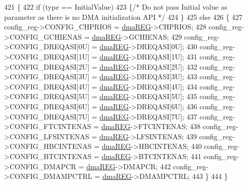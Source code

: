 \begin{DoxyCode}
421 \{
422     \textcolor{keywordflow}{if} (type == InitialValue)
423     \{\textcolor{comment}{/* Do not pass Initial value as parameter as there is no DMA initialization API */}
424     \}
425     \textcolor{keywordflow}{else}
426     \{
427         config\_reg->CONFIG\_CHPRIOS     = \mbox{\hyperlink{reg__dma_8h_aae27308852f460efc99fcbf6eb47ea86}{dmaREG}}->CHPRIOS;
428         config\_reg->CONFIG\_GCHIENAS    = \mbox{\hyperlink{reg__dma_8h_aae27308852f460efc99fcbf6eb47ea86}{dmaREG}}->GCHIENAS;
429         config\_reg->CONFIG\_DREQASI[0U] = \mbox{\hyperlink{reg__dma_8h_aae27308852f460efc99fcbf6eb47ea86}{dmaREG}}->DREQASI[0U];
430         config\_reg->CONFIG\_DREQASI[1U] = \mbox{\hyperlink{reg__dma_8h_aae27308852f460efc99fcbf6eb47ea86}{dmaREG}}->DREQASI[1U];
431         config\_reg->CONFIG\_DREQASI[2U] = \mbox{\hyperlink{reg__dma_8h_aae27308852f460efc99fcbf6eb47ea86}{dmaREG}}->DREQASI[2U];
432         config\_reg->CONFIG\_DREQASI[3U] = \mbox{\hyperlink{reg__dma_8h_aae27308852f460efc99fcbf6eb47ea86}{dmaREG}}->DREQASI[3U];
433         config\_reg->CONFIG\_DREQASI[4U] = \mbox{\hyperlink{reg__dma_8h_aae27308852f460efc99fcbf6eb47ea86}{dmaREG}}->DREQASI[4U];
434         config\_reg->CONFIG\_DREQASI[5U] = \mbox{\hyperlink{reg__dma_8h_aae27308852f460efc99fcbf6eb47ea86}{dmaREG}}->DREQASI[5U];
435         config\_reg->CONFIG\_DREQASI[6U] = \mbox{\hyperlink{reg__dma_8h_aae27308852f460efc99fcbf6eb47ea86}{dmaREG}}->DREQASI[6U];
436         config\_reg->CONFIG\_DREQASI[7U] = \mbox{\hyperlink{reg__dma_8h_aae27308852f460efc99fcbf6eb47ea86}{dmaREG}}->DREQASI[7U];
437         config\_reg->CONFIG\_FTCINTENAS  = \mbox{\hyperlink{reg__dma_8h_aae27308852f460efc99fcbf6eb47ea86}{dmaREG}}->FTCINTENAS;
438         config\_reg->CONFIG\_LFSINTENAS  = \mbox{\hyperlink{reg__dma_8h_aae27308852f460efc99fcbf6eb47ea86}{dmaREG}}->LFSINTENAS;
439         config\_reg->CONFIG\_HBCINTENAS  = \mbox{\hyperlink{reg__dma_8h_aae27308852f460efc99fcbf6eb47ea86}{dmaREG}}->HBCINTENAS;
440         config\_reg->CONFIG\_BTCINTENAS  = \mbox{\hyperlink{reg__dma_8h_aae27308852f460efc99fcbf6eb47ea86}{dmaREG}}->BTCINTENAS;
441         config\_reg->CONFIG\_DMAPCR      = \mbox{\hyperlink{reg__dma_8h_aae27308852f460efc99fcbf6eb47ea86}{dmaREG}}->DMAPCR;
442         config\_reg->CONFIG\_DMAMPCTRL   = \mbox{\hyperlink{reg__dma_8h_aae27308852f460efc99fcbf6eb47ea86}{dmaREG}}->DMAMPCTRL;
443     \}
444 \}
\end{DoxyCode}
\mbox{\label{group__DMA_ga0fd24f134d8c414943021de657a37a86}} 
